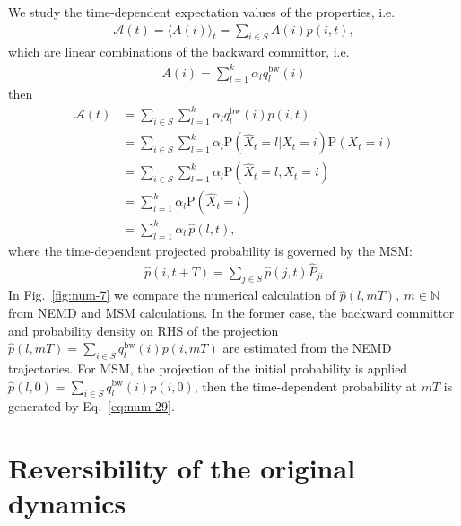 \documentclass[aps, pre, preprint,unsortedaddress,a4paper,onecolumn]{revtex4}
\newcommand{\bwd}[0]{\textrm{bw}}
\newcommand{\prob}{\textrm{P}}
\begin{document}
We study the time-dependent expectation values of
the properties, i.e.
\begin{align}
  \mathcal A(t) = \langle A(i)\rangle_t = \sum_{i\in S} A(i) p(i,t),
\end{align}
which are linear combinations of the backward
committor, i.e.
\begin{align}
  A(i) = \sum_{l=1}^k \alpha_l q^\bwd_l(i)
\end{align}
then
\begin{align}\nonumber
  \mathcal A(t) &=
  \sum_{i\in S} \sum_{l=1}^k \alpha_l q^\bwd_l(i)  p(i,t) \\\nonumber
  & =
  \sum_{i\in S} \sum_{l=1}^k \alpha_l \prob (\hat X_t = l \vert X_t = i) \prob (X_t = i) \\\nonumber
  & =
  \sum_{i\in S} \sum_{l=1}^k \alpha_l \prob (\hat X_t = l ,X_t = i) \\\nonumber
  & =
  \sum_{l=1}^k \alpha_l \prob (\hat X_t = l) \\\label{eq:num-28}
  & =
   \sum_{l=1}^k \alpha_l \,\hat p (l, t),
\end{align}
where the time-dependent projected probability is governed by the MSM:
\begin{align}\label{eq:num-29}
  \hat p(i, t+T) = \sum_{j\in S} \hat p(j,t)\hat P_{ji}
\end{align}
In Fig.~\ref{fig:num-7} we compare the numerical calculation of $\hat p (l, mT), \ m\in\mathbb N$ from NEMD and MSM calculations.
In the former case, the backward committor and probability density
on RHS of the projection $\hat p (l, mT) = \sum_{i\in S}  q^\bwd_l(i)  p(i,mT) $
are estimated from the
NEMD trajectories. For MSM, the projection of the initial probability is applied $\hat p (l, 0) = \sum_{i\in S}  q^\bwd_l(i)  p(i,0) $, then
the time-dependent probability at $mT$ is generated by Eq.~\eqref{eq:num-29}.




\appendix



\section{Reversibility of the original dynamics}
\label{sec:revs}
\end{document}
